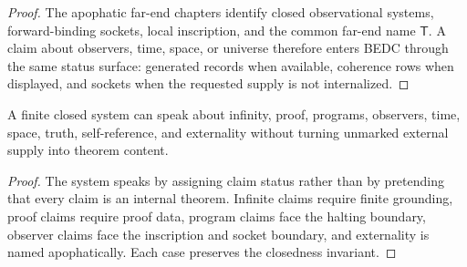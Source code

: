 \begin{proof}
The apophatic far-end chapters identify closed observational systems,
forward-binding sockets, local inscription, and the common far-end name
$\mathsf{T}$.  A claim about observers, time, space, or universe therefore
enters BEDC through the same status surface: generated records when
available, coherence rows when displayed, and sockets when the requested
supply is not internalized.
\end{proof}

\begin{corollary}
\label{cor:legitimate-claim-honest-speech}
A finite closed system can speak about infinity, proof, programs,
observers, time, space, truth, self-reference, and externality without
turning unmarked external supply into theorem content.
\end{corollary}

\begin{proof}
The system speaks by assigning claim status rather than by pretending that
every claim is an internal theorem.  Infinite claims require finite
grounding, proof claims require proof data, program claims face the halting
boundary, observer claims face the inscription and socket boundary, and
externality is named apophatically.  Each case preserves the closedness
invariant.
\end{proof}

